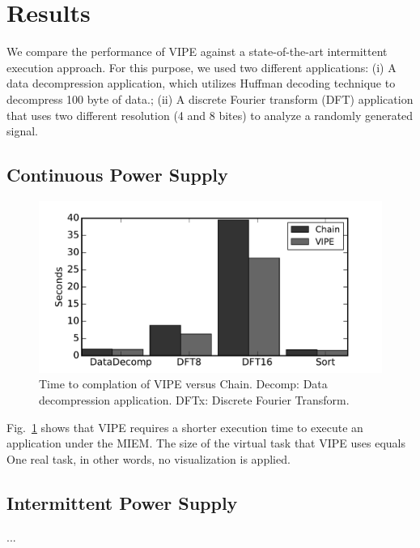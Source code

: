 \documentclass[pageno]{jpaper}
\newcommand{\sys}{VIPE\xspace}
\begin{document}
\section{Results}
We compare the performance of \sys against a state-of-the-art intermittent execution approach. For this purpose, we used two different applications: (i) A data decompression application, which utilizes Huffman decoding technique to decompress 100 byte of data.; (ii) A discrete Fourier transform (DFT) application that uses two different resolution (4 and 8 bites) to analyze a randomly generated signal. 

\subsection{Continuous Power Supply}

\begin{figure}[t]
	\centering
	\includegraphics[width=0.8\columnwidth]{figures/chain_vipe}
	\caption{Time to complation of \sys versus Chain. Decomp: Data decompression application. DFTx: Discrete Fourier Transform.}
	\label{fig:IPOSPerformance}
\end{figure}

Fig.~\ref{fig:IPOSPerformance} shows that \sys requires a shorter execution time to execute an application under the MIEM. The size of the virtual task that \sys uses equals One real task, in other words, no visualization is applied.



\subsection{Intermittent Power Supply}
...



\end{document}
